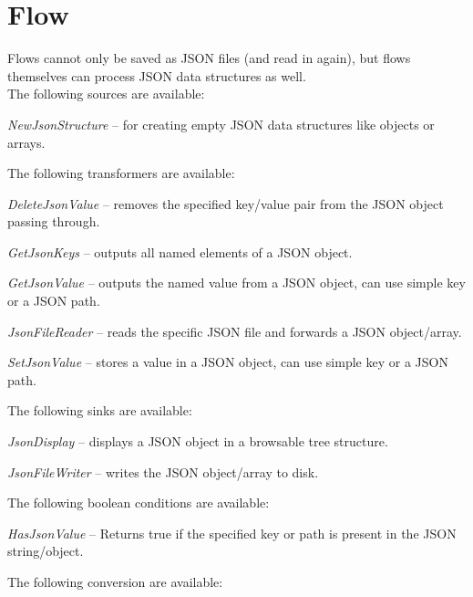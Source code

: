 \documentclass[a4paper]{book}
\begin{document}
\chapter{Flow}
Flows cannot only be saved as JSON\cite{json} files (and read in again), but flows
themselves can process JSON data structures as well. \\
The following sources are available:
\begin{tight_itemize}
	\item \textit{NewJsonStructure} -- for creating empty JSON data structures
	like objects or arrays.
\end{tight_itemize}
The following transformers are available:
\begin{tight_itemize}
	\item \textit{DeleteJsonValue} -- removes the specified key/value pair
	from the JSON object passing through.
	\item \textit{GetJsonKeys} -- outputs all named elements
	of a JSON object.
	\item \textit{GetJsonValue} -- outputs the named value
	from a JSON object, can use simple key or a JSON
	path\cite{jsonpath}.
	\item \textit{JsonFileReader} -- reads the specific JSON file and forwards
	a JSON object/array.
	\item \textit{SetJsonValue} -- stores a value in a JSON object, can
	use simple key or a JSON path\cite{jsonpath}.
\end{tight_itemize}
The following sinks are available:
\begin{tight_itemize}
	\item \textit{JsonDisplay} -- displays a JSON object in a browsable
	tree structure.
	\item \textit{JsonFileWriter} -- writes the JSON object/array to disk.
\end{tight_itemize}
The following boolean conditions are available:
\begin{tight_itemize}
	\item \textit{HasJsonValue} -- Returns true if the specified key or path is present in the JSON string/object.
\end{tight_itemize}
The following conversion are available:
\end{document}
